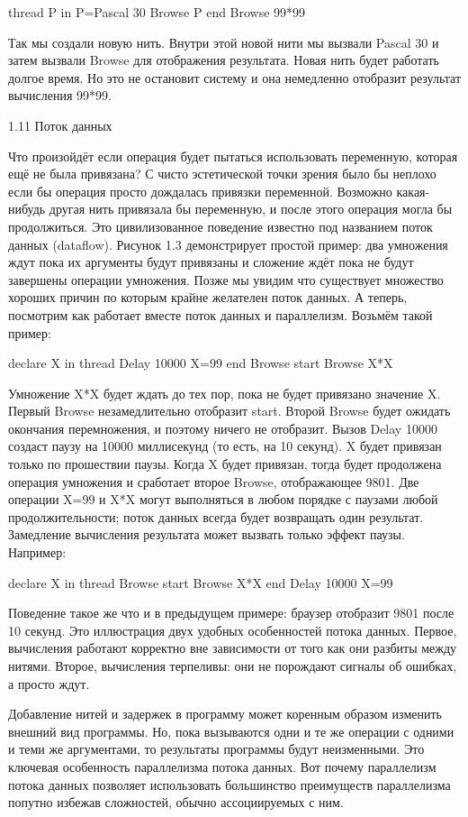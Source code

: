 thread P in
P={Pascal 30}
{Browse P}
end
{Browse 99*99}

Так мы создали новую нить. Внутри этой новой нити мы вызвали {Pascal 30} и затем вызвали Browse для отображения результата. Новая нить будет работать долгое время. Но это не остановит систему и она немедленно отобразит результат вычисления 99*99.

1.11 Поток данных

Что произойдёт если операция будет пытаться использовать переменную, которая ещё не была привязана? С чисто эстетической точки зрения было бы неплохо если бы операция просто дождалась привязки переменной. Возможно какая-нибудь другая нить привязала бы переменную, и после этого операция могла бы продолжиться. Это цивилизованное поведение известно под названием поток данных (dataflow). Рисунок 1.3 демонстрирует простой пример: два умножения ждут пока их аргументы будут привязаны и сложение ждёт пока не будут завершены операции умножения. Позже мы увидим что существует множество хороших причин по которым крайне желателен поток данных. А теперь, посмотрим как работает вместе поток данных и параллелизм. Возьмём такой пример:

declare X in
thread {Delay 10000} X=99 end
{Browse start} {Browse X*X}

Умножение X*X будет ждать до тех пор, пока не будет привязано значение X. Первый Browse незамедлительно отобразит start. Второй Browse будет ожидать окончания перемножения, и поэтому ничего не отобразит. Вызов {Delay 10000} создаст паузу на 10000 миллисекунд (то есть, на 10 секунд). X будет привязан только по прошествии паузы. Когда X будет привязан, тогда будет продолжена операция умножения и сработает второе Browse, отображающее 9801. Две операции X=99 и X*X могут выполняться в любом порядке с паузами любой продолжительности; поток данных всегда будет возвращать один результат. Замедление вычисления результата может вызвать только эффект паузы. Например:

declare X in
thread {Browse start} {Browse X*X} end
{Delay 10000} X=99

Поведение такое же что и в предыдущем примере: браузер отобразит 9801 после 10 секунд. Это иллюстрация двух удобных особенностей потока данных. Первое, вычисления работают корректно вне зависимости от того как они разбиты между нитями. Второе, вычисления терпеливы: они не порождают сигналы об ошибках, а просто ждут.

Добавление нитей и задержек в программу может коренным образом изменить внешний вид программы. Но, пока вызываются одни и те же операции с одними и теми же аргументами, то результаты программы будут неизменными. Это ключевая особенность параллелизма потока данных. Вот почему параллелизм потока данных позволяет использовать большинство преимуществ параллелизма попутно избежав сложностей, обычно ассоциируемых с ним.


